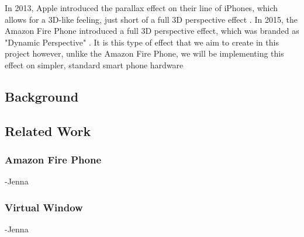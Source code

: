 \documentclass[12pt,twocolumn,letterpaper]{article}
\begin{document}
In 2013, Apple introduced the parallax effect on their line of iPhones, which allows for a 3D-like feeling, just short of a full 3D perspective effect \cite{BusinessInsider}.  In 2015, the Amazon Fire Phone introduced a full 3D perspective effect, which was branded as "Dynamic Perspective" \cite{DigitalTrends}.  It is this type of effect that we aim to create in this project however, unlike the Amazon Fire Phone, we will be implementing this effect on simpler, standard smart phone hardware
\subsection{Background}
    
\subsection{Related Work}
\subsubsection{Amazon Fire Phone}
     -Jenna
\subsubsection{Virtual Window}
     -Jenna
     
\end{document}
